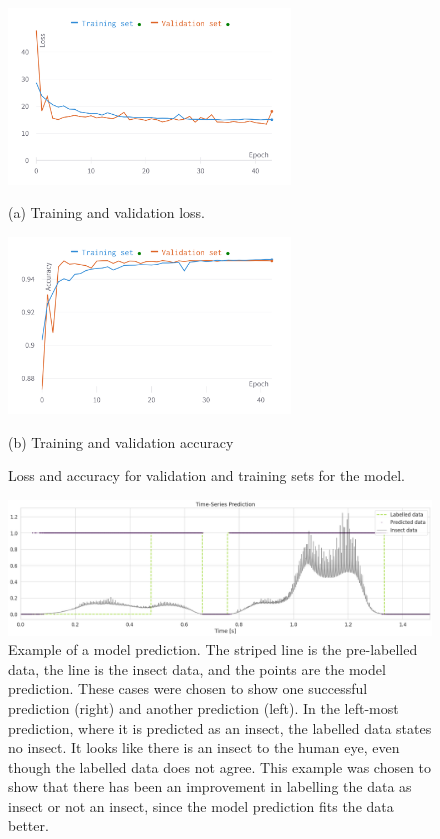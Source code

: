 \begin{figure}[htb]
\begin{minipage}[b]{0.48\textwidth}
  \centering
  \includegraphics[width=7.5cm]{Figures/loss}
  \centerline{(a) Training and validation loss.}
\end{minipage}
\begin{minipage}[b]{.48\textwidth}
  \centering
  \centerline{\includegraphics[width=7.5cm]{Figures/acc}}
  \centerline{(b) Training and validation accuracy}
\end{minipage}
\caption{Loss and accuracy for validation and training sets for the model.}
\label{fig:acc_loss}
\end{figure}

\begin{figure}[htb]
  \centering
  \includegraphics[width=\textwidth]{Figures/insect_results}
  \caption{Example of a model prediction. The striped line is the pre-labelled data, the line is the insect data, and the points are the model prediction. These cases were chosen to show one successful prediction (right) and another prediction (left). In the left-most prediction, where it is predicted as an insect, the labelled data states no insect. It looks like there is an insect to the human eye, even though the labelled data does not agree. This example was chosen to show that there has been an improvement in labelling the data as insect or not an insect, since the model prediction fits the data better.}
  \label{fig:predict}
\end{figure}

